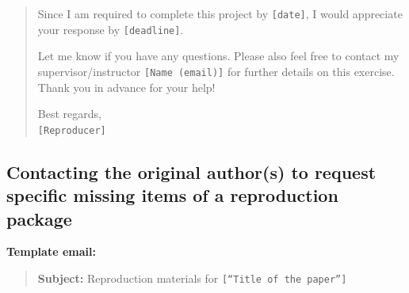 \documentclass[]{book}
\begin{document}
\begin{quote}
Since I am required to complete this project by \texttt{{[}date{]}}, I would appreciate your response by \texttt{{[}deadline{]}}.

Let me know if you have any questions. Please also feel free to contact my supervisor/instructor \texttt{{[}Name\ (email){]}} for further details on this exercise. Thank you in advance for your help!

Best regards,\\
\texttt{{[}Reproducer{]}}
\end{quote}

\hypertarget{contacting-the-original-authors-to-request-specific-missing-items-of-a-reproduction-package}{%
\subsection{Contacting the original author(s) to request specific missing items of a reproduction package}\label{contacting-the-original-authors-to-request-specific-missing-items-of-a-reproduction-package}}

\textbf{Template email:}

\begin{quote}
\textbf{Subject:} Reproduction materials for \texttt{{[}“Title\ of\ the\ paper”{]}}
\end{quote}
\end{document}
